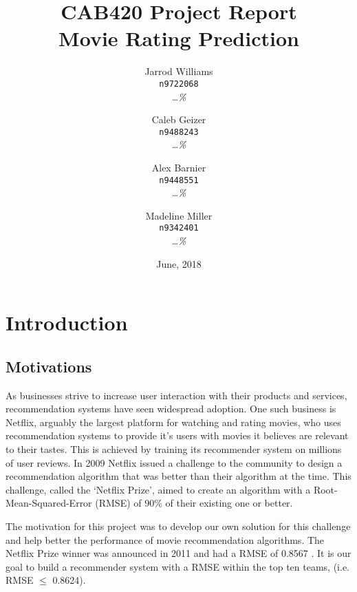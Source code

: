 \documentclass{report}
\begin{document}
	\title{CAB420 Project Report \\ \large{Movie Rating Prediction}}
	\author{
		Jarrod Williams\\
		\texttt{n9722068}\\
		\emph{\dots\%}
		\and 
		Caleb Geizer\\
		\texttt{n9488243}\\
		\emph{\dots\%}
		\and
		Alex Barnier\\
		\texttt{n9448551}\\
		\emph{\dots\%}
		\and	
		Madeline Miller\\
		\texttt{n9342401}\\
		\emph{\dots\%}
	}
	\date{June, 2018}
	\maketitle
	
	\chapter{Introduction}
	\section{Motivations}
	As businesses strive to increase user interaction with their products and services, recommendation systems have seen widespread adoption. One such business is Netflix, arguably the largest platform for watching and rating movies, who uses recommendation systems to provide it’s users with movies it believes are relevant to their tastes. This is achieved by training its recommender system on millions of user reviews. In 2009 Netflix issued a challenge to the community to design a recommendation algorithm that was better than their algorithm at the time. This challenge, called the ‘Netflix Prize’, aimed to create an algorithm with a Root-Mean-Squared-Error (RMSE) of 90\% of their existing one or better.
	
	The motivation for this project was to develop our own solution for this challenge and help better the performance of movie recommendation algorithms. The Netflix Prize winner was announced in 2011 and had a RMSE of 0.8567 \autocite{NeflixLeader}. It is our goal to build a recommender system with a RMSE within the top ten teams, (i.e. RMSE $\leq$ 0.8624).
\end{document}
